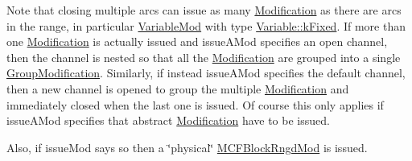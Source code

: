 Note that closing multiple arcs can issue as many \mbox{\hyperlink{class_s_m_spp__di__unipi__it_1_1_modification}{Modification}} as there are arcs in the range, in particular \mbox{\hyperlink{class_s_m_spp__di__unipi__it_1_1_variable_mod}{Variable\+Mod}} with type \mbox{\hyperlink{class_s_m_spp__di__unipi__it_1_1_variable_a30febf04ce89c19659143fa83ae6f7baaf0cb52fcb65ba1ee2e93ef655d5c7693}{Variable\+::k\+Fixed}}. If more than one \mbox{\hyperlink{class_s_m_spp__di__unipi__it_1_1_modification}{Modification}} is actually issued and issue\+A\+Mod specifies an open channel, then the channel is nested so that all the \mbox{\hyperlink{class_s_m_spp__di__unipi__it_1_1_modification}{Modification}} are grouped into a single \mbox{\hyperlink{class_s_m_spp__di__unipi__it_1_1_group_modification}{Group\+Modification}}. Similarly, if instead issue\+A\+Mod specifies the default channel, then a new channel is opened to group the multiple \mbox{\hyperlink{class_s_m_spp__di__unipi__it_1_1_modification}{Modification}} and immediately closed when the last one is issued. Of course this only applies if issue\+A\+Mod specifies that abstract \mbox{\hyperlink{class_s_m_spp__di__unipi__it_1_1_modification}{Modification}} have to be issued.

Also, if issue\+Mod says so then a \char`\"{}physical\char`\"{} \mbox{\hyperlink{class_s_m_spp__di__unipi__it_1_1_m_c_f_block_rngd_mod}{M\+C\+F\+Block\+Rngd\+Mod}} is issued. \mbox{\label{class_s_m_spp__di__unipi__it_1_1_m_c_f_block_acc843b2f20a57f8e3380d90c844c1686}} 
